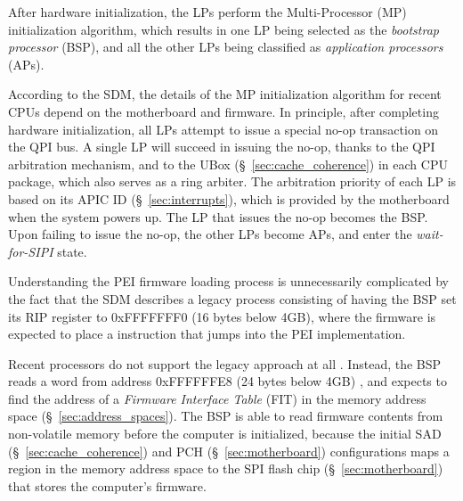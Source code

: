 
After hardware initialization, the LPs perform the Multi-Processor (MP)
initialization algorithm, which results in one LP being selected as the
\textit{bootstrap processor} (BSP), and all the other LPs being classified as
\textit{application processors} (APs).

According to the SDM, the details of the MP initialization algorithm for recent
CPUs depend on the motherboard and firmware. In principle, after completing
hardware initialization, all LPs attempt to issue a special no-op transaction
on the QPI bus. A single LP will succeed in issuing the no-op, thanks to
the QPI arbitration mechanism, and to the UBox (\S~\ref{sec:cache_coherence})
in each CPU package, which also serves as a ring arbiter. The arbitration
priority of each LP is based on its APIC ID (\S~\ref{sec:interrupts}), which is
provided by the motherboard when the system powers up. The LP that issues the
no-op becomes the BSP. Upon failing to issue the no-op, the other LPs become
APs, and enter the \textit{wait-for-SIPI} state.


Understanding the PEI firmware loading process is unnecessarily complicated by
the fact that the SDM describes a legacy process consisting of having the BSP
set its RIP register to 0xFFFFFFF0 (16 bytes below 4GB), where the firmware is
expected to place a instruction that jumps into the PEI implementation.


Recent processors do not support the legacy approach at all
\cite{reinauer2013fitpatch}. Instead, the BSP reads a word from address
0xFFFFFFE8 (24 bytes below 4GB) \cite{intel2012uefihypervisor, datta2013acm},
and expects to find the address of a \textit{Firmware Interface Table} (FIT)
in the memory address space (\S~\ref{sec:address_spaces}). The BSP is able to
read firmware contents from non-volatile memory before the computer is
initialized, because the initial SAD (\S~\ref{sec:cache_coherence}) and PCH
(\S~\ref{sec:motherboard}) configurations maps a region in the memory address
space to the SPI flash chip (\S~\ref{sec:motherboard}) that stores the
computer's firmware.

